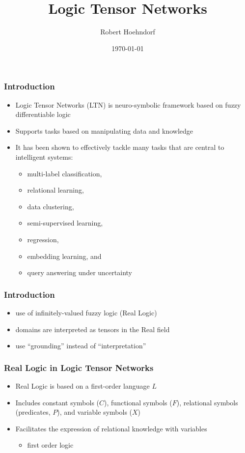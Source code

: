 \documentclass{beamer}
\title{Logic Tensor Networks}
\author{Robert Hoehndorf}
\date{\today}
\begin{document}
\frame{\titlepage}

\begin{frame}
  \frametitle{Introduction}
  \begin{itemize}
  \item Logic Tensor Networks (LTN) is neuro-symbolic framework based
    on fuzzy differentiable logic
  \item Supports tasks based on manipulating data and knowledge
  \item It has been shown to effectively tackle many tasks that are
    central to intelligent systems:
    \begin{itemize}
    \item multi-label classification,
    \item relational learning,
    \item data clustering,
    \item semi-supervised learning,
    \item regression,
    \item embedding learning, and
    \item query answering under uncertainty
    \end{itemize}
  \end{itemize}
\end{frame}

\begin{frame}
  \frametitle{Introduction}
  \begin{itemize}
  \item use of infinitely-valued fuzzy logic (Real Logic)
  \item domains are interpreted as tensors in the Real field
  \item use ``grounding'' instead of ``interpretation''
  \end{itemize}
\end{frame}

\begin{frame}
\frametitle{Real Logic in Logic Tensor Networks}
\begin{itemize}
    \item Real Logic is based on a first-order language \( L \)
    \item Includes constant symbols (\( C \)), functional symbols (\(
      F \)), relational symbols (predicates, \( P \)), and variable
      symbols (\( X \))
    \item Facilitates the expression of relational knowledge with variables
      \begin{itemize}
      \item first order logic
      \end{itemize}
\end{itemize}
\end{frame}
\end{document}
